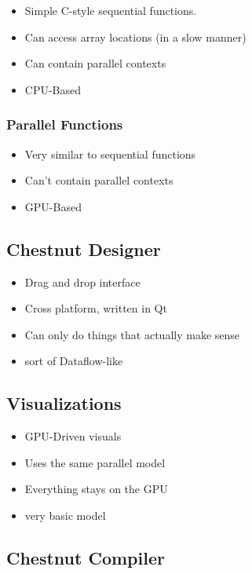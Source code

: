\begin{itemize}
\item Simple C-style sequential functions.
\item Can access array locations (in a slow manner)
\item Can contain parallel contexts
\item CPU-Based
\end{itemize}

\subsubsection{Parallel Functions}

\begin{itemize}
\item Very similar to sequential functions
\item Can't contain parallel contexts
\item GPU-Based
\end{itemize}

\subsection{Chestnut Designer}

\begin{itemize}
\item Drag and drop interface
\item Cross platform, written in Qt
\item Can only do things that actually make sense
\item sort of Dataflow-like
\end{itemize}

\subsection{Visualizations}

\begin{itemize}
\item GPU-Driven visuals
\item Uses the same parallel model
\item Everything stays on the GPU
\item very basic model
\end{itemize}

\subsection{Chestnut Compiler}

